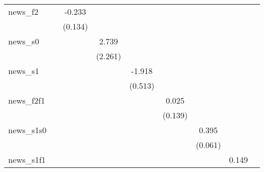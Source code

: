 {\begin{tabular}{l*{8}{c}}
\addlinespace
news\_f2     &                     &      -0.233\sym{*}  &                     &                     &                     &                     &                     &                     \\
            &                     &     (0.134)         &                     &                     &                     &                     &                     &                     \\
\addlinespace
news\_s0     &                     &                     &       2.739         &                     &                     &                     &                     &                     \\
            &                     &                     &     (2.261)         &                     &                     &                     &                     &                     \\
\addlinespace
news\_s1     &                     &                     &                     &      -1.918\sym{***}&                     &                     &                     &                     \\
            &                     &                     &                     &     (0.513)         &                     &                     &                     &                     \\
\addlinespace
news\_f2f1   &                     &                     &                     &                     &       0.025         &                     &                     &                     \\
            &                     &                     &                     &                     &     (0.139)         &                     &                     &                     \\
\addlinespace
news\_s1s0   &                     &                     &                     &                     &                     &       0.395\sym{***}&                     &                     \\
            &                     &                     &                     &                     &                     &     (0.061)         &                     &                     \\
\addlinespace
news\_s1f1   &                     &                     &                     &                     &                     &                     &       0.149         &                     \\

\end{tabular}}
